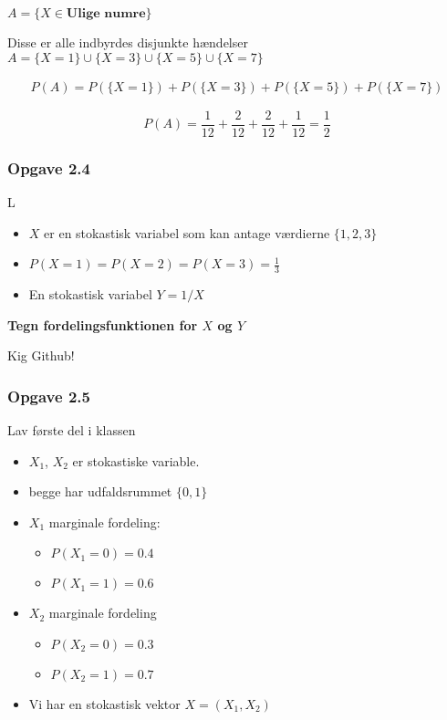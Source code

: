 $A = \{X \in \textbf{Ulige numre}\}$

Disse er alle indbyrdes disjunkte hændelser
$A = \{X = 1 \}  \cup \{ X= 3 \} \cup \{X = 5 \} \cup \{X= 7 \}$

\begin{align}
    P(A) = P(\{X = 1 \}) + P(\{ X= 3 \}) + P(\{X = 5 \}) + P(\{X= 7 \})
\end{align}

\begin{equation}
    P(A) = \frac{1}{12} + \frac{2}{12} + \frac{2}{12} + \frac{1}{12} = \frac{1}{2}
\end{equation}
    
\subsubsection{Opgave 2.4}

L\begin{itemize}
    \item $X$ er en stokastisk variabel som kan antage værdierne $\{1, 2, 3\}$
    \item $P(X =1) = P(X=2) = P(X=3) =  \frac{1}{3}$
    \item En stokastisk variabel $Y=1/X$
\end{itemize}

\textbf{Tegn fordelingsfunktionen for $X$ og $Y$}

Kig Github!

\subsubsection{Opgave 2.5}

Lav første del i klassen

\begin{itemize}
    \item $X_1$, $X_2$ er stokastiske variable.
    \item begge har udfaldsrummet $\{0, 1\}$
    \item $X_1$ marginale fordeling:
    \begin{itemize}
        \item $P(X_1=0)=0.4$
        \item $P(X_1=1)=0.6$
    \end{itemize}
    \item $X_2$ marginale fordeling
    \begin{itemize}
        \item $P(X_2=0)=0.3$
        \item $P(X_2=1)=0.7$
    \end{itemize}
    \item Vi har en stokastisk vektor $X = (X_1, X_2)$
\end{itemize}

